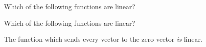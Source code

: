 \documentclass{ximera}
\begin{document}
\begin{question}
  Which of the following functions are linear?
  \begin{solution}
    \begin{multiple-choice}
    \end{multiple-choice}
  \end{solution}
\end{question}

\begin{question}
  Which of the following functions are linear?
  \begin{solution}
    \begin{multiple-choice}
    \end{multiple-choice}
  \end{solution}

  The function which sends every vector to the zero vector \textit{is} linear.
\end{question}
	
\end{document}
